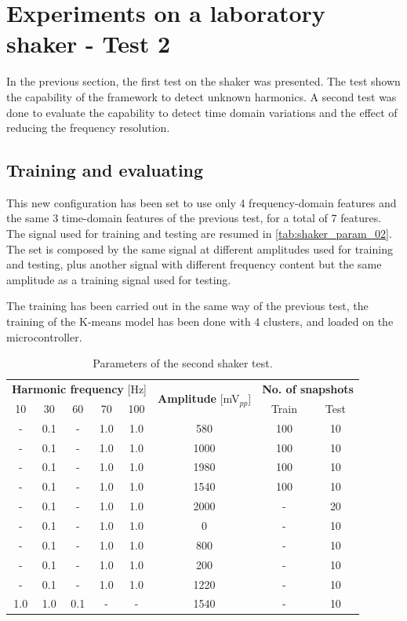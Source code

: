 \section{Experiments on a laboratory shaker - Test 2}
In the previous section, the first test on the shaker was presented. The test shown the capability of the framework to detect unknown harmonics. A second test was done to evaluate the capability to detect time domain variations and the effect of reducing the frequency resolution. 

\subsection{Training and evaluating}
This new configuration has been set to use only 4 frequency-domain features and the same 3 time-domain features of the previous test, for a total of 7 features. The signal used for training and testing are resumed in \autoref{tab:shaker_param_02}. The set is composed by the same signal at different amplitudes used for training and testing, plus another signal with different frequency content but the same amplitude as a training signal used for testing. 

The training has been carried out in the same way of the previous test, the training of the K-means model has been done with 4 clusters, and loaded on the microcontroller. 

\begin{table}
    \centering
    \caption{Parameters of the second shaker test.}
    \label{tab:shaker_param_02}
    \begin{tabular}{cccccccc} 
    \toprule
    \multicolumn{5}{c}{\textbf{Harmonic frequency} {[}Hz]} & \multirow{2}{*}{\textbf{Amplitude }{[}mV$_{pp}$]} & \multicolumn{2}{c}{\textbf{ No. of snapshots}} \\
    10 & 30 & 60 & 70 & 100 &  & Train & Test \\ 
    \hline
    - & 0.1 & - & 1.0 & 1.0 & 580 & 100 & 10 \\
    - & 0.1 & - & 1.0 & 1.0 & 1000 & 100 & 10 \\
    - & 0.1 & - & 1.0 & 1.0 & 1980 & 100 & 10 \\
    - & 0.1 & - & 1.0 & 1.0 & 1540 & 100 & 10 \\
    - & 0.1 & - & 1.0 & 1.0 & 2000 & - & 20 \\
    - & 0.1 & - & 1.0 & 1.0 & 0 & - & 10 \\
    - & 0.1 & - & 1.0 & 1.0 & 800 & - & 10 \\
    - & 0.1 & - & 1.0 & 1.0 & 200 & - & 10 \\
    - & 0.1 & - & 1.0 & 1.0 & 1220 & - & 10 \\
    1.0 & 1.0 & 0.1 & - & - & 1540 & - & 10 \\
    \bottomrule
    \end{tabular}
    \end{table}




